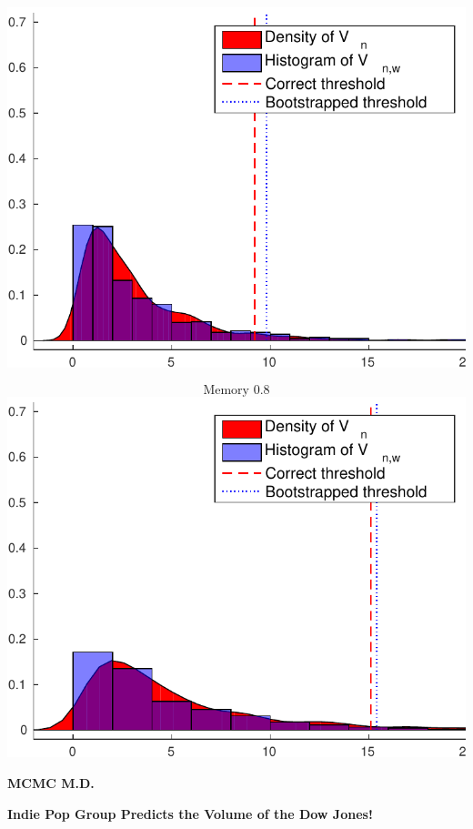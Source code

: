 \documentclass[landscape,a0]{a0poster_csml_v2}
\begin{document}
\begin{poster}
\begin{PosterColumn}
\begin{minipage}[c]{0.24\textwidth}
\includegraphics[width=\textwidth]{../img/wild_ecdf7.pdf} 
\end{minipage}
\begin{minipage}[c]{0.24\textwidth} $$\text{Memory } 0.8$$
\includegraphics[width=\textwidth]{../img/wild_ecdf8.pdf} 
\end{minipage}

\vspace{1cm}


\begin{minipage}[c]{0.4\textwidth}
\bf MCMC M.D.
\end{minipage}
\begin{minipage}[c]{0.6\textwidth}
\bf Indie Pop Group Predicts the Volume of the Dow Jones!
\end{minipage}



\end{PosterColumn}
\end{poster}
\end{document}
